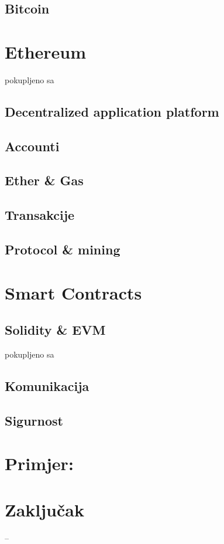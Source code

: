\documentclass[12pt]{report}
\begin{document}
\section{Bitcoin}

\chapter{Ethereum}

pokupljeno sa \cite{ethdocs}

\section{Decentralized application platform}

\section{Accounti}

\section{Ether \& Gas}

\section{Transakcije}

\section{Protocol \& mining}

\chapter{Smart Contracts}

\section{Solidity \& EVM}

pokupljeno sa \cite{soliditydocs}

\section{Komunikacija}

\section{Sigurnost}

\chapter{Primjer:}

\chapter{Zaključak}

\printbibliography--
\end{document}
